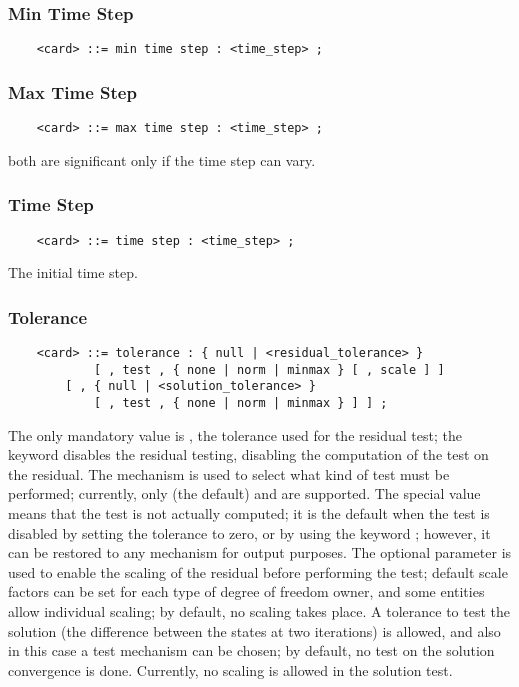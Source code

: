 \subsubsection{Min Time Step}
\begin{verbatim}
    <card> ::= min time step : <time_step> ;
\end{verbatim}

\subsubsection{Max Time Step}
\begin{verbatim}
    <card> ::= max time step : <time_step> ;
\end{verbatim}
both are significant only if the time step can vary.

\subsubsection{Time Step}
\begin{verbatim}
    <card> ::= time step : <time_step> ;
\end{verbatim}
The initial time step.

\subsubsection{Tolerance}
\begin{verbatim}
    <card> ::= tolerance : { null | <residual_tolerance> }
            [ , test , { none | norm | minmax } [ , scale ] ]
        [ , { null | <solution_tolerance> } 
            [ , test , { none | norm | minmax } ] ] ;
\end{verbatim}
The only mandatory value is , 
the tolerance used for the residual test; the keyword 
disables the residual testing, disabling the computation
of the test on the residual.
The  mechanism is used to select what kind of test must
be performed; currently, only  (the default) 
and  are supported.
The special value  means that the test is not actually 
computed; it is the default when the test is disabled by setting
the tolerance to zero, or by using the keyword ;
however, it can be restored to any mechanism for output purposes.
The optional parameter  is used to enable the scaling
of the residual before performing the test; default scale factors 
can be set for each type of degree of freedom owner, and some
entities allow individual scaling; by default, no scaling takes place.
A tolerance  to test the solution 
(the difference between the states at two iterations) is allowed, 
and also in this case a test mechanism can be chosen;
by default, no test on the solution convergence is done.
Currently, no scaling is allowed in the solution test.

